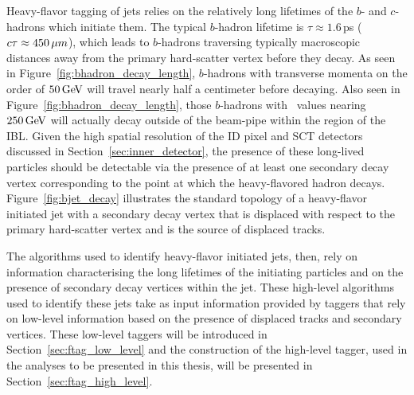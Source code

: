 Heavy-flavor tagging of jets relies on the relatively long lifetimes of the $b$- and $c$-hadrons which
initiate them. The typical $b$-hadron lifetime is $\tau \approx 1.6$\,ps ($c\tau \approx 450\,\mu m$),
which leads to $b$-hadrons traversing typically macroscopic distances away from the primary hard-scatter vertex
before they decay.
As seen in Figure~\ref{fig:bhadron_decay_length}, $b$-hadrons with transverse momenta on the order of
$50\,\text{Ge\kern -0.1em V}$ will travel nearly half a centimeter before decaying.
Also seen in Figure~\ref{fig:bhadron_decay_length}, those $b$-hadrons with \pT~values nearing $250\,\text{Ge\kern -0.1em V}$ will actually decay
outside of the beam-pipe within the region of the IBL.
Given the high spatial resolution of the ID pixel and SCT detectors discussed in Section~\ref{sec:inner_detector}, the presence of these long-lived particles
should be detectable via the presence of at least one secondary decay vertex corresponding to the point at which
the heavy-flavored hadron decays.
Figure~\ref{fig:bjet_decay} illustrates the standard topology of a heavy-flavor initiated jet with a secondary decay vertex that is displaced
with respect to the primary hard-scatter vertex and is the source of displaced tracks.

The algorithms used to identify heavy-flavor initiated jets, then, rely on information characterising
the long lifetimes of the initiating particles and on the presence of secondary decay vertices within the jet.
These high-level algorithms used to identify these jets take as input information provided by taggers that rely on low-level information based on
the presence of displaced tracks and secondary vertices.
These low-level taggers will be introduced in Section~\ref{sec:ftag_low_level} and the construction of the
high-level tagger, used in the analyses to be presented in this thesis, will be presented in Section~\ref{sec:ftag_high_level}.



